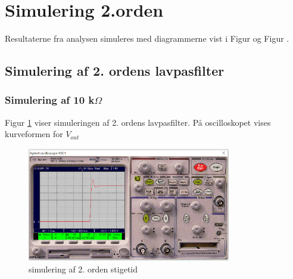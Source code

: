 \section{Simulering 2.orden}
Resultaterne fra analysen simuleres med diagrammerne vist i Figur  og Figur . 

\subsection{Simulering af 2. ordens lavpasfilter}

\subsubsection{Simulering af 10 k$\Omega$ }
Figur \ref{2orden/stigetid} viser simuleringen af 2. ordens lavpasfilter. På oscilloskopet vises kurveformen for $V_{out}$ 

\begin{figure}[h]
 \begin{center}
  \includegraphics[height=5cm]{P_fig/figur8_1k_stigetid}
  \caption{simulering af 2. orden stigetid}
  \label{2orden/stigetid}
 \end{center}
\end{figure}